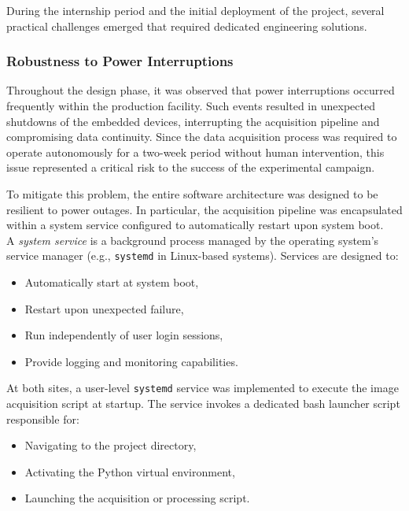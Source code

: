 
During the internship period and the initial deployment of the project, several practical challenges emerged that required dedicated engineering solutions.

\subsubsection{Robustness to Power Interruptions}

Throughout the design phase, it was observed that power interruptions occurred frequently within the production facility. Such events resulted in unexpected shutdowns of the embedded devices, interrupting the acquisition pipeline and compromising data continuity. Since the data acquisition process was required to operate autonomously for a two-week period without human intervention, this issue represented a critical risk to the success of the experimental campaign.

To mitigate this problem, the entire software architecture was designed to be resilient to power outages. In particular, the acquisition pipeline was encapsulated within a system service configured to automatically restart upon system boot.\cite{systemd_service_2026}
\\
A \emph{system service} is a background process managed by the operating system's service manager (e.g., \texttt{systemd} in Linux-based systems). Services are designed to:

\begin{itemize}
    \item Automatically start at system boot,
    \item Restart upon unexpected failure,
    \item Run independently of user login sessions,
    \item Provide logging and monitoring capabilities.
\end{itemize}
\newpage
At both sites, a user-level \texttt{systemd} service was implemented to execute the image acquisition script at startup. The service invokes a dedicated bash launcher script responsible for:

\begin{itemize}
    \item Navigating to the project directory,
    \item Activating the Python virtual environment,
    \item Launching the acquisition or processing script.
\end{itemize}

